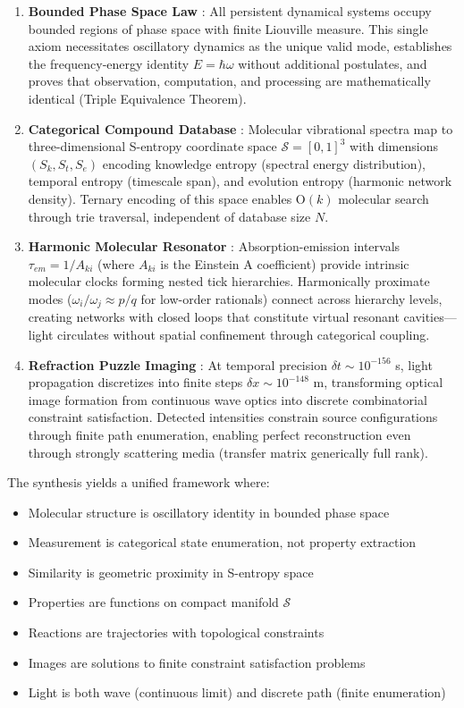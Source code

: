 \documentclass[11pt,a4paper]{article}
\theoremstyle{definition}
\theoremstyle{remark}
\begin{document}
\begin{enumerate}
\item \textbf{Bounded Phase Space Law} \cite{sachikonye2025bounded}: All persistent dynamical systems occupy bounded regions of phase space with finite Liouville measure. This single axiom necessitates oscillatory dynamics as the unique valid mode, establishes the frequency-energy identity $E = \hbar\omega$ without additional postulates, and proves that observation, computation, and processing are mathematically identical (Triple Equivalence Theorem).

\item \textbf{Categorical Compound Database} \cite{sachikonye2025categorical}: Molecular vibrational spectra map to three-dimensional S-entropy coordinate space $\mathcal{S} = [0,1]^3$ with dimensions $(S_k, S_t, S_e)$ encoding knowledge entropy (spectral energy distribution), temporal entropy (timescale span), and evolution entropy (harmonic network density). Ternary encoding of this space enables O$(k)$ molecular search through trie traversal, independent of database size $N$.

\item \textbf{Harmonic Molecular Resonator} \cite{sachikonye2026harmonic}: Absorption-emission intervals $\tau_{em} = 1/A_{ki}$ (where $A_{ki}$ is the Einstein A coefficient) provide intrinsic molecular clocks forming nested tick hierarchies. Harmonically proximate modes ($\omega_i/\omega_j \approx p/q$ for low-order rationals) connect across hierarchy levels, creating networks with closed loops that constitute virtual resonant cavities—light circulates without spatial confinement through categorical coupling.

\item \textbf{Refraction Puzzle Imaging} \cite{sachikonye2026refraction}: At temporal precision $\delta t \sim 10^{-156}$ s, light propagation discretizes into finite steps $\delta x \sim 10^{-148}$ m, transforming optical image formation from continuous wave optics into discrete combinatorial constraint satisfaction. Detected intensities constrain source configurations through finite path enumeration, enabling perfect reconstruction even through strongly scattering media (transfer matrix generically full rank).
\end{enumerate}

The synthesis yields a unified framework where:
\begin{itemize}
\item Molecular structure is oscillatory identity in bounded phase space
\item Measurement is categorical state enumeration, not property extraction
\item Similarity is geometric proximity in S-entropy space
\item Properties are functions on compact manifold $\mathcal{S}$
\item Reactions are trajectories with topological constraints
\item Images are solutions to finite constraint satisfaction problems
\item Light is both wave (continuous limit) and discrete path (finite enumeration)
\end{itemize}
\end{document}
